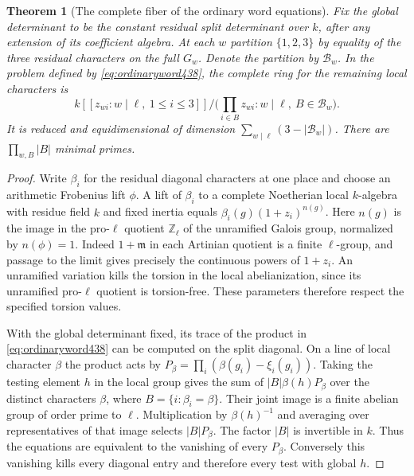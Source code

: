 \documentclass[a4paper,11pt]{article}
\newtheorem{theorem}[proposition]{Theorem}
\theoremstyle{definition}
\theoremstyle{remark}
\newcommand{\ZZ}{\mathbb Z}\newcommand{\ord}{\operatorname{ord}}
\numberwithin{equation}{section}
\begin{document}
\begin{theorem}[The complete fiber of the ordinary word equations]\leavevmode
\label{thm:splitwordfiber438}
Fix the global determinant to be the constant residual split
determinant over \(k\), after any extension of its coefficient
algebra. At each \(w\) partition \(\{1,2,3\}\) by equality of
the three residual characters on the \emph{full} \(G_w\).
Denote the partition by \(\mathcal B_w\).
In the problem defined by \eqref{eq:ordinaryword438}, the
complete ring for the remaining local characters is
\[
 k[[z_{wi}:w\mid\ell,\ 1\le i\le3]]
 \Big/\Big(\prod_{i\in B}z_{wi}: w\mid\ell,\ B\in\mathcal B_w\Big).
\]
It is reduced and equidimensional of dimension
\(\sum_{w\mid\ell}(3-|\mathcal B_w|)\).
There are \(\prod_{w,B}|B|\) minimal primes.
\end{theorem}
\begin{proof}
Write \(\beta_i\) for the residual diagonal characters at one
place and choose an arithmetic Frobenius lift \(\phi\). A lift
of \(\beta_i\) to a complete Noetherian local \(k\)-algebra
with residue field \(k\) and fixed inertia equals
\(\beta_i(g)(1+z_i)^{n(g)}\). Here \(n(g)\) is the image in
the pro-\(\ell\) quotient \(\ZZ_\ell\) of the unramified
Galois group, normalized by \(n(\phi)=1\).
Indeed \(1+\mathfrak m\) in each Artinian quotient is a
finite \(\ell\)-group, and passage to the limit gives precisely
the continuous powers of \(1+z_i\). An unramified variation
kills the torsion in the local abelianization, since its
unramified pro-\(\ell\) quotient is torsion-free. These
parameters therefore respect the specified torsion values.

With the global determinant fixed, its trace of the product
in \eqref{eq:ordinaryword438} can be computed on the split
diagonal. On a line of local character \(\beta\) the product
acts by \(P_\beta=\prod_i(\beta(g_i)-\xi_i(g_i))\).
Taking the testing element \(h\) in the local group gives the
sum of \(|B|\beta(h)P_\beta\) over the distinct characters
\(\beta\), where \(B=\{i:\beta_i=\beta\}\).
Their joint image is a finite abelian group of order prime to
\(\ell\). Multiplication by \(\beta(h)^{-1}\) and averaging
over representatives of that image selects \(|B|P_\beta\).
The factor \(|B|\) is invertible in \(k\). Thus the equations
are equivalent to the vanishing of every \(P_\beta\).
Conversely this vanishing kills every diagonal entry and
therefore every test with global \(h\).


\end{proof}
\end{document}
